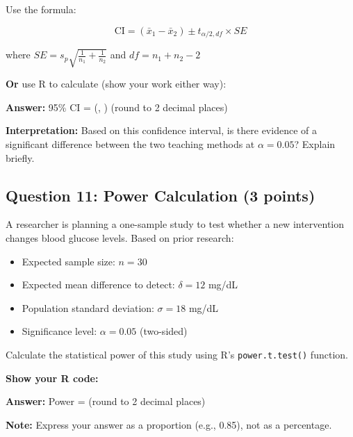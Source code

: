 \documentclass[11pt]{article}
\begin{document}
Use the formula:

$$\text{CI} = (\bar{x}_1 - \bar{x}_2) \pm t_{\alpha/2, df} \times SE$$

where $SE = s_p \sqrt{\frac{1}{n_1} + \frac{1}{n_2}}$ and $df = n_1 + n_2 - 2$

\textbf{Or} use R to calculate (show your work either way):

\vspace{4cm}

\textbf{Answer:} 95\% CI = (\underline{\hspace{2cm}}, \underline{\hspace{2cm}}) (round to 2 decimal places)

\vspace{0.5cm}

\textbf{Interpretation:} Based on this confidence interval, is there evidence of a significant difference between the two teaching methods at $\alpha = 0.05$? Explain briefly.

\vspace{2cm}

\subsection*{Question 11: Power Calculation (3 points)}

A researcher is planning a one-sample study to test whether a new intervention changes blood glucose levels. Based on prior research:

\begin{itemize}
\item Expected sample size: $n = 30$
\item Expected mean difference to detect: $\delta = 12$ mg/dL
\item Population standard deviation: $\sigma = 18$ mg/dL
\item Significance level: $\alpha = 0.05$ (two-sided)
\end{itemize}

Calculate the statistical power of this study using R's \texttt{power.t.test()} function.

\vspace{0.3cm}

\textbf{Show your R code:}

\vspace{4cm}

\textbf{Answer:} Power = \underline{\hspace{3cm}} (round to 2 decimal places)

\vspace{0.5cm}

\textbf{Note:} Express your answer as a proportion (e.g., 0.85), not as a percentage.

\vspace{1cm}
\end{document}
